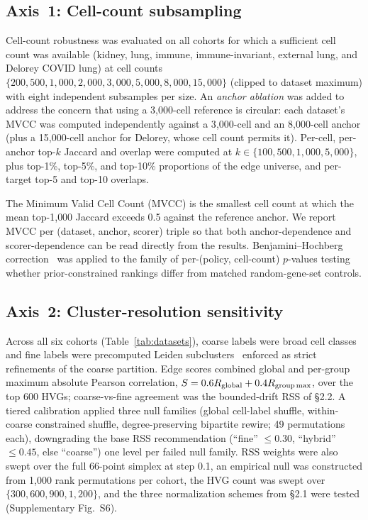 \documentclass[12pt]{article}
\begin{document}
\subsection{Axis~1: Cell-count subsampling}

Cell-count robustness was evaluated on all cohorts for which a
sufficient cell count was available (kidney, lung, immune,
immune-invariant, external lung, and Delorey COVID lung) at cell
counts $\{200, 500, 1{,}000, 2{,}000, 3{,}000, 5{,}000, 8{,}000,
15{,}000\}$ (clipped to dataset maximum) with eight independent
subsamples per size. An \emph{anchor ablation} was added to address
the concern that using a 3{,}000-cell reference is circular: each
dataset's MVCC was computed independently against a 3{,}000-cell and
an 8{,}000-cell anchor (plus a 15{,}000-cell anchor for Delorey,
whose cell count permits it). Per-cell, per-anchor top-$k$ Jaccard
and overlap were computed at $k \in \{100, 500, 1{,}000, 5{,}000\}$,
plus top-1\%, top-5\%, and top-10\% proportions of the edge universe,
and per-target top-5 and top-10 overlaps.

The Minimum Valid Cell Count (MVCC) is the smallest cell count at which
the mean top-1{,}000 Jaccard exceeds 0.5 against the reference anchor.
We report MVCC per (dataset, anchor, scorer) triple so that both
anchor-dependence and scorer-dependence can be read directly from
the results. Benjamini--Hochberg correction~\citep{BenjaminiHochberg1995}
was applied to the family of per-(policy, cell-count) $p$-values testing
whether prior-constrained rankings differ from matched random-gene-set
controls.

\subsection{Axis~2: Cluster-resolution sensitivity}

Across all six cohorts (Table~\ref{tab:datasets}), coarse labels
were broad cell classes and fine labels were precomputed Leiden
subclusters~\citep{Traag2019} enforced as strict refinements of the
coarse partition.
Edge scores combined global and per-group maximum absolute Pearson
correlation, $S = 0.6 R_{\text{global}} + 0.4 R_{\text{group\,max}}$,
over the top 600 HVGs; coarse-vs-fine agreement was the bounded-drift
RSS of §2.2. A tiered calibration applied three null families
(global cell-label shuffle, within-coarse constrained shuffle,
degree-preserving bipartite rewire; 49 permutations each), downgrading
the base RSS recommendation (``fine'' $\leq 0.30$, ``hybrid'' $\leq 0.45$,
else ``coarse'') one level per failed null family. RSS weights were
also swept over the full 66-point simplex at step 0.1, an empirical
null was constructed from 1{,}000 rank permutations per cohort, the
HVG count was swept over $\{300, 600, 900, 1{,}200\}$, and the three
normalization schemes from §2.1 were tested (Supplementary Fig.~S6).
\end{document}
